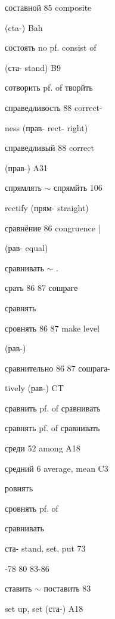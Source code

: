 \clearpage
\thispagestyle{plain}
\begingroup
\cyrillicfont
\fontsize{7.25}{8.25}\selectfont
\setlength{\parindent}{0pt}
\setlength{\parskip}{0pt}
\setlength{\emergencystretch}{1.5em}
\noindent
\begin{minipage}[t]{0.475\textwidth}
\raggedright
\noindent составной 85 composite\par
\noindent (cta-) Bah\par
\noindent состоять no pf. consist of\par
\noindent (ста- stand) B9\par
\noindent сотворить pf. of творйть\par
\noindent справедливость 88  correct-\par
\noindent ness (прав- rect- right)\par
\noindent справедливый 88 correct\par
\noindent (прав-) A31\par
\noindent спрямлять $\sim$ спрямйть 106\par
\noindent rectify (прям- straight)\par
\noindent сравнёние 86 congruence |\par
\noindent (рав- equal)\par
\noindent сравнивать $\sim$ .\par
\noindent срать 86 87 сошраге\par
\noindent сравнять\par
\noindent сровнять 86 87 make level\par
\noindent (рав-)\par
\noindent сравнительно 86 87 сошрага-\par
\noindent tively (рав-) CT\par
\noindent сравнить pf. of сравнивать\par
\noindent сравнять pf. of сравнивать\par
\noindent среди 52 among A18\par
\noindent средний 6 average, mean C3\par
\noindent ровнять\par
\noindent сровнять pf. of\par
\noindent сравнивать\par
\noindent ста- stand, set, put 73\par
{}-78 80 83-86\par
\noindent ставить $\sim$ поставить 83\par
\noindent set up, set (ста-) A18\par

\end{minipage}
